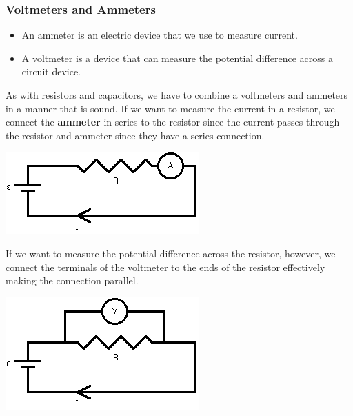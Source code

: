 \documentclass[9pt,addpoints]{exam}
\begin{document}
\subsubsection*{Voltmeters and Ammeters}
\begin{itemize}
	\item An ammeter is an electric device that we use to measure current.
	\item A voltmeter is a device that can measure the potential difference across a circuit device.
\end{itemize}
As with resistors and capacitors, we have to combine a voltmeters and ammeters in a manner that is sound. \newline\newline
If we want to measure the current in a resistor, we connect the \textbf{ammeter} in series to the resistor since the current passes through the resistor and ammeter since they have a series connection.\newline
\begin{center}
	\includegraphics[scale=0.5]{ammeter.png}
\end{center}If we want to measure the potential difference across the resistor, however, we connect the terminals of the voltmeter to the ends of the resistor effectively making the connection parallel.\newline
\begin{center}
\includegraphics[scale=0.5]{voltmeter.png} 	
\end{center}
\end{document}
